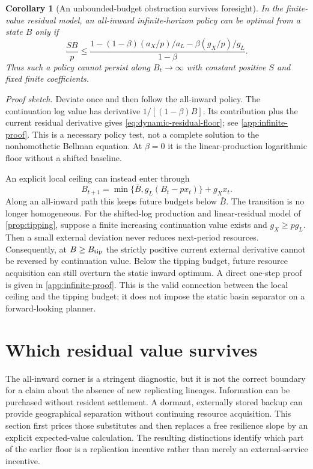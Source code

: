 \documentclass[11pt,a4paper]{article}
\newtheorem{corollary}[proposition]{Corollary}
\theoremstyle{definition}\newtheorem{definition}{Definition}
\begin{document}
\begin{corollary}[An unbounded-budget obstruction survives foresight]
\label{cor:dynamic-residual}
In the finite-value residual model, an all-inward infinite-horizon policy
can be optimal from a state $B$ only if
\begin{equation}
 \frac{SB}{p}\leq
 \frac{1-(1-\beta)(a_X/p)/a_L-\beta(g_X/p)/g_L}{1-\beta}.
 \label{eq:dynamic-residual-floor}
\end{equation}
Thus such a policy cannot persist along $B_t\to\infty$ with constant
positive $S$ and fixed finite coefficients.
\end{corollary}
\noindent\emph{Proof sketch.}
Deviate once and then follow the all-inward policy. The continuation log
value has derivative $1/[(1-\beta)B]$. Its contribution plus the current
residual derivative gives \cref{eq:dynamic-residual-floor}; see
\cref{app:infinite-proof}. This is a necessary policy test, not a complete
solution to the nonhomothetic Bellman equation. At $\beta=0$ it is the
linear-production logarithmic floor without a shifted baseline.

An explicit local ceiling can instead enter through
\begin{equation}
 B_{t+1}=\min\{\bar B,g_L(B_t-px_t)\}+g_Xx_t.
 \label{eq:capped-transition}
\end{equation}
Along an all-inward path this keeps future budgets below $\bar B$.
The transition is no longer homogeneous. For the shifted-log production
and linear-residual model of \cref{prop:tipping}, suppose a finite
increasing continuation value exists and $g_X\geq pg_L$. Then a small
external deviation never reduces next-period resources. Consequently,
at $B\geq B_{\rm tip}$ the strictly positive current external derivative
cannot be reversed by continuation value. Below the tipping budget,
future resource acquisition can still overturn the static inward optimum.
A direct one-step proof is given in \cref{app:infinite-proof}.
This is the valid connection between the local ceiling and the tipping
budget; it does not impose the static basin separator on a forward-looking
planner.

\section{Which residual value survives}
\label{sec:residual}

The all-inward corner is a stringent diagnostic, but it is not the correct
boundary for a claim about the absence of new replicating lineages.
Information can be purchased without resident settlement. A dormant,
externally stored backup can provide geographical separation without
continuing resource acquisition. This section first prices those substitutes
and then replaces a free resilience slope by an explicit expected-value
calculation. The resulting distinctions identify which part of the earlier
floor is a replication incentive rather than merely an external-service
incentive.
\end{document}
